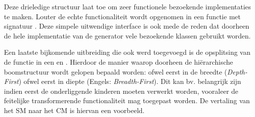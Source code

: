 Deze drieledige structuur laat toe om zeer functionele bezoekende
implementaties te maken. Louter de echte functionaliteit wordt opgenomen in een
functie met signatuur . Deze simpele uitwendige interface
is ook mede de reden dat doorheen de hele implementatie van de generator vele
bezoekende klassen gebruikt worden.

Een laatste bijkomende uitbreiding die ook werd toegevoegd is de opsplitsing
van de  functie in een  en
. Hierdoor de manier waarop doorheen de
hi\"erarchische boomstructuur wordt gelopen bepaald worden: ofwel eerst in de
breedte (\emph{Depth-First}) ofwel eerst in diepte (Engels:
\emph{Breadth-First}). Dit kan bv. belangrijk zijn indien eerst de
onderliggende kinderen moeten verwerkt worden, vooraleer de feitelijke
transformerende functionaliteit mag toegepast worden. De vertaling van het SM
naar het CM is hiervan een voorbeeld.
